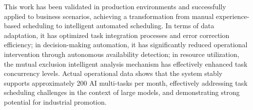 \begin{abstract*}
This work has been validated in production environments and successfully applied to business scenarios, achieving a transformation from manual experience-based scheduling to intelligent automated scheduling. In terms of data adaptation, it has optimized task integration processes and error correction efficiency; in decision-making automation, it has significantly reduced operational intervention through autonomous availability detection; in resource utilization, the mutual exclusion intelligent analysis mechanism has effectively enhanced task concurrency levels. Actual operational data shows that the system stably supports approximately 200 AI multi-tasks per month, effectively addressing task scheduling challenges in the context of large models, and demonstrating strong potential for industrial promotion.

\end{abstract*}
